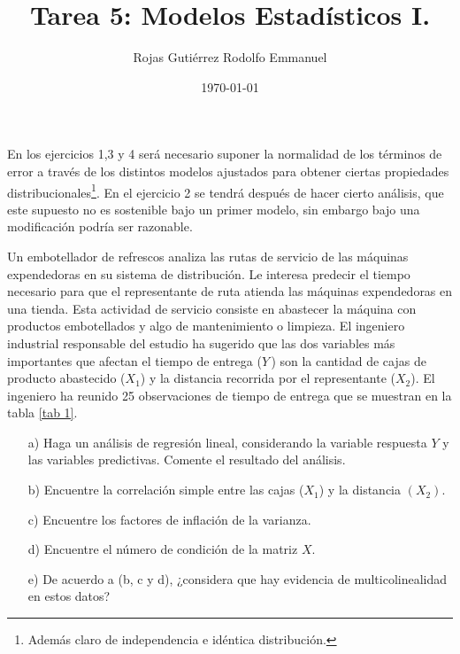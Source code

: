 \documentclass[10.5pt,notitlepage]{article}
\title{Tarea 5: Modelos Estadísticos I.}
\author{Rojas Gutiérrez Rodolfo Emmanuel}
\date{\today}
\renewcommand{\qedsymbol}{$\blacksquare$}
\theoremstyle{plain}
\newenvironment{rem}
  {\pushQED{\qed}\renewcommand{\qedsymbol}{$\triangle$}\remarkex}
  {\popQED\endremarkex}
\begin{document}
\maketitle

\begin{rem}
En los ejercicios 1,3 y 4 será necesario suponer la normalidad de los términos de error a través de los distintos modelos ajustados para obtener ciertas propiedades distribucionales\footnote{Además claro de independencia e idéntica distribución.}. En el ejercicio 2 se tendrá después de hacer cierto análisis, que este supuesto no es sostenible bajo un primer modelo, sin embargo bajo una modificación podría ser razonable.
\end{rem}
\setcounter{exo}{0}
\begin{exo}

    Un embotellador de refrescos analiza las rutas de servicio de las máquinas expendedoras en su sistema de distribución. Le interesa predecir el tiempo necesario para que el representante de ruta atienda las máquinas expendedoras en una tienda. Esta actividad de servicio  consiste en abastecer la máquina con productos embotellados y algo de mantenimiento o limpieza. El ingeniero industrial responsable del estudio ha sugerido que las dos variables más importantes que afectan el tiempo de entrega ($Y\,$) son la cantidad de cajas de producto abastecido ($X_1$) y la distancia recorrida por el representante ($X_2$). El ingeniero ha reunido 25 observaciones de tiempo de entrega que se muestran en la tabla \ref{tab 1}.
     \begin{itemize}
        \item[a)] Haga un análisis de regresión lineal, considerando la variable respuesta $Y$ y las variables predictivas. Comente el resultado del análisis.
        \item[b)] Encuentre la correlación simple entre las cajas ($X_1$) y la distancia $(X_2)$.
        \item[c)] Encuentre los factores de inflación de la varianza.
        \item[d)] Encuentre el número de condición de la matriz $X$.
        \item[e)] De acuerdo a (b, c y d), ¿considera que hay evidencia de multicolinealidad en estos datos?
     \end{itemize}
\end{exo}
\end{document}
